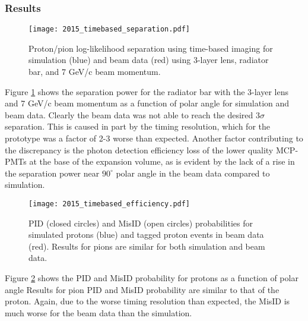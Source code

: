 \subsubsection{Results}
\begin{figure}[!htb]
	\centering
	\texttt{[image: 2015\_timebased\_separation.pdf]}
	\caption{Proton/pion log-likelihood separation using time-based imaging for simulation (blue) and beam data (red) using 3-layer lens, radiator bar, and 7 GeV/c beam momentum.}
	\label{fig:2015_timebased_separation}
\end{figure}

Figure \ref{fig:2015_timebased_separation} shows the separation power for the radiator bar with the 3-layer lens and 7 GeV/c beam momentum as a function of polar angle for simulation and beam data. Clearly the beam data was not able to reach the desired $3\sigma$ separation. This is caused in part by the timing resolution, which for the prototype was a factor of 2-3 worse than expected. Another factor contributing to the discrepancy is the photon detection efficiency loss of the lower quality MCP-PMTs at the base of the expansion volume, as is evident by the lack of a rise in the separation power near $90^\circ$ polar angle in the beam data compared to simulation.

\begin{figure}[!htb]
	\centering
	\texttt{[image: 2015\_timebased\_efficiency.pdf]}
	\caption{PID (closed circles) and MisID (open circles) probabilities for simulated protons (blue) and tagged proton events in beam data (red). Results for pions are similar for both simulation and beam data.}
	\label{fig:2015_timebased_efficiency}
\end{figure}
Figure \ref{fig:2015_timebased_efficiency} shows the PID and MisID probability for protons as a function of polar angle Results for pion PID and MisID probability are similar to that of the proton. Again, due to the worse timing resolution than expected, the MisID is much worse for the beam data than the simulation.
